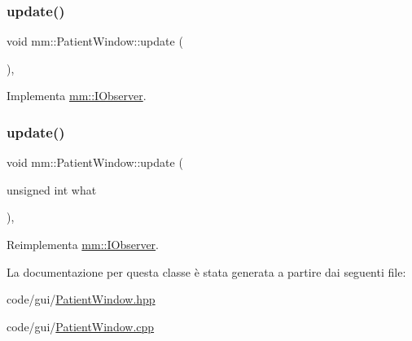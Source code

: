 \subsubsection{\texorpdfstring{update()}{update()}\hspace{0.1cm}{\footnotesize\ttfamily [1/2]}}
{\footnotesize\ttfamily void mm\+::\+Patient\+Window\+::update (\begin{DoxyParamCaption}{ }\end{DoxyParamCaption})\hspace{0.3cm}{\ttfamily [override]}, {\ttfamily [virtual]}}



Implementa \mbox{\hyperlink{classmm_1_1_i_observer_a6422af04f8e9f3ba9d6d412a3bcdd03e}{mm\+::\+I\+Observer}}.

\mbox{\label{classmm_1_1_patient_window_a315f5e823a0261db4fb88b4e31333d53}} 
\subsubsection{\texorpdfstring{update()}{update()}\hspace{0.1cm}{\footnotesize\ttfamily [2/2]}}
{\footnotesize\ttfamily void mm\+::\+Patient\+Window\+::update (\begin{DoxyParamCaption}\item[{unsigned int}]{what }\end{DoxyParamCaption})\hspace{0.3cm}{\ttfamily [override]}, {\ttfamily [virtual]}}



Reimplementa \mbox{\hyperlink{classmm_1_1_i_observer_add1245a281c47575cc0e42449635a9fd}{mm\+::\+I\+Observer}}.



La documentazione per questa classe è stata generata a partire dai seguenti file\+:\begin{DoxyCompactItemize}
\item 
code/gui/\mbox{\hyperlink{_patient_window_8hpp}{Patient\+Window.\+hpp}}\item 
code/gui/\mbox{\hyperlink{_patient_window_8cpp}{Patient\+Window.\+cpp}}\end{DoxyCompactItemize}
